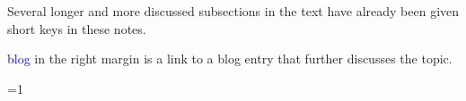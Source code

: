 \documentclass{report}
\begin{document}
Several longer and more discussed subsections in the text have already
been given short keys in these notes.

\textcolor{blue}{blog} in the right margin is a link to a blog entry
that further discusses the topic.

\clearpage
{}

\Large

\def\basicStat{1}     %
\ifnum\basicStat=1




%
%
%
%
%
%
%
%
%
%
%
%
%
%
%
%
%
\else





















\fi

\dobib
\end{document}
